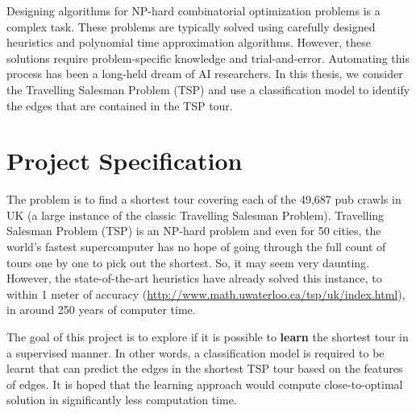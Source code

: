 \documentclass[]{UCD_CS_FYP_Report}
\begin{document}
\maketitle


\tableofcontents


\abstract
Designing algorithms for NP-hard combinatorial optimization problems is a complex task. These problems are typically solved using carefully designed heuristics and polynomial time approximation algorithms. However, these solutions require problem-specific knowledge and trial-and-error. Automating this process has been a long-held dream of AI researchers. In this thesis, we consider the Travelling Salesman Problem (TSP) and use a classification model to identify the edges that are contained in the TSP tour. 


\chapter{Project Specification}
The problem is to find a shortest tour covering each of the 49,687 pub crawls in UK (a large instance of the classic Travelling Salesman Problem). Travelling Salesman Problem (TSP) is an NP-hard problem and even for 50 cities, the world's fastest supercomputer has no hope of going through the full count of tours one by one to pick out the shortest. So, it may seem very daunting. However, the state-of-the-art heuristics have already solved this instance, to within 1 meter of accuracy (\url{http://www.math.uwaterloo.ca/tsp/uk/index.html}), in around 250 years of computer time.

The goal of this project is to explore if it is possible to \textbf{learn} the shortest tour in a supervised manner. In other words, a classification model is required to be learnt that can predict the edges in the shortest TSP tour based on the features of edges. It is hoped that the learning approach would compute close-to-optimal solution in significantly less computation time.\\[0.5cm]
\end{document}
